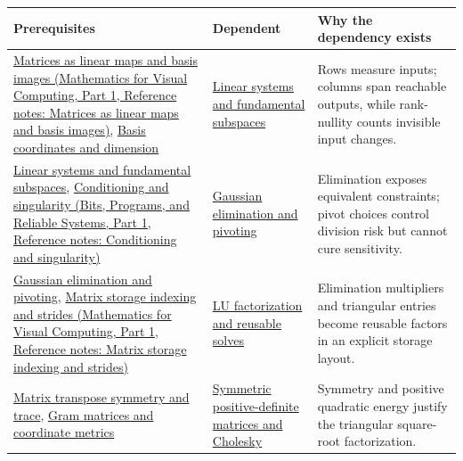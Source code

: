 {\def\LTcaptype{none} %
\begin{longtable}[]{@{}
  >{\raggedright\arraybackslash}p{}
  >{\raggedright\arraybackslash}p{}
  >{\raggedright\arraybackslash}p{}@{}}
\toprule\noalign{}
\begin{minipage}[b]{\linewidth}\raggedright
Prerequisites
\end{minipage} & \begin{minipage}[b]{\linewidth}\raggedright
Dependent
\end{minipage} & \begin{minipage}[b]{\linewidth}\raggedright
Why the dependency exists
\end{minipage} \\
\midrule\noalign{}
\endhead
\bottomrule\noalign{}
\endlastfoot
\href{../02-Mathematics-for-Visual-Computing-P01/main.pdf\#appendix-bd39c3bf5d64}{Matrices as linear maps and basis images (Mathematics for Visual Computing, Part 1, Reference notes: Matrices as linear maps and basis images)}, \hyperref[appendix-ce0341f7ea0d]{Basis coordinates and dimension} & \hyperref[appendix-8572a4a060c1]{Linear systems and fundamental subspaces} & Rows measure inputs; columns span reachable outputs, while rank-nullity counts invisible input changes. \\
\hyperref[appendix-8572a4a060c1]{Linear systems and fundamental subspaces}, \href{../01-Bits-Programs-and-Reliable-Systems-P01/main.pdf\#appendix-8f6a01f284a7}{Conditioning and singularity (Bits, Programs, and Reliable Systems, Part 1, Reference notes: Conditioning and singularity)} & \hyperref[appendix-f6e77f4a200f]{Gaussian elimination and pivoting} & Elimination exposes equivalent constraints; pivot choices control division risk but cannot cure sensitivity. \\
\hyperref[appendix-f6e77f4a200f]{Gaussian elimination and pivoting}, \href{../02-Mathematics-for-Visual-Computing-P01/main.pdf\#appendix-ffdc1d4e5350}{Matrix storage indexing and strides (Mathematics for Visual Computing, Part 1, Reference notes: Matrix storage indexing and strides)} & \hyperref[appendix-55e4b5b0a1e6]{LU factorization and reusable solves} & Elimination multipliers and triangular entries become reusable factors in an explicit storage layout. \\
\hyperref[appendix-175ca5ff874d]{Matrix transpose symmetry and trace}, \hyperref[appendix-3b863809f82a]{Gram matrices and coordinate metrics} & \hyperref[appendix-50d2ea3c9b26]{Symmetric positive-definite matrices and Cholesky} & Symmetry and positive quadratic energy justify the triangular square-root factorization. \\

\end{longtable}}
